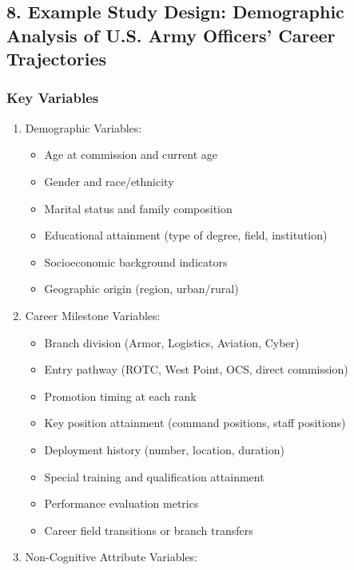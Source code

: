 \documentclass[
  letterpaper,
  DIV=11,
  numbers=noendperiod]{scrartcl}
\providecommand{\tightlist}{%
  \setlength{\itemsep}{0pt}\setlength{\parskip}{0pt}}
\begin{document}
\subsection{8. Example Study Design: Demographic Analysis of U.S. Army
Officers' Career
Trajectories}\label{example-study-design-demographic-analysis-of-u.s.-army-officers-career-trajectories}

\subsubsection{Key Variables}\label{key-variables}

\begin{enumerate}
\def\labelenumi{\arabic{enumi}.}
\tightlist
\item
  Demographic Variables:

  \begin{itemize}
  \tightlist
  \item
    Age at commission and current age
  \item
    Gender and race/ethnicity
  \item
    Marital status and family composition
  \item
    Educational attainment (type of degree, field, institution)
  \item
    Socioeconomic background indicators
  \item
    Geographic origin (region, urban/rural)
  \end{itemize}
\item
  Career Milestone Variables:

  \begin{itemize}
  \tightlist
  \item
    Branch division (Armor, Logistics, Aviation, Cyber)
  \item
    Entry pathway (ROTC, West Point, OCS, direct commission)
  \item
    Promotion timing at each rank
  \item
    Key position attainment (command positions, staff positions)
  \item
    Deployment history (number, location, duration)
  \item
    Special training and qualification attainment
  \item
    Performance evaluation metrics
  \item
    Career field transitions or branch transfers
  \end{itemize}
\item
  Non-Cognitive Attribute Variables:


\end{enumerate}
\end{document}
